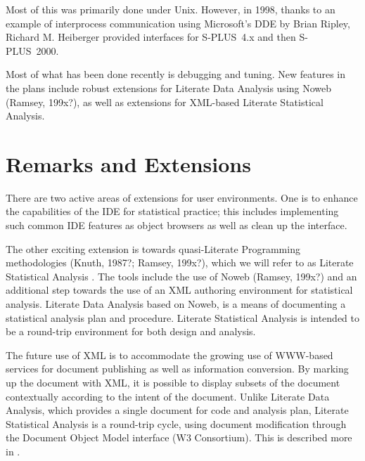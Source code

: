 \documentclass{article}
\newcommand*{\Splus}{\textsc{S-PLUS}}
\begin{document}
Most of this was primarily done under Unix.  However, in 1998, thanks
to an example of interprocess communication using Microsoft's DDE by
Brian Ripley, Richard M. Heiberger provided interfaces for \Splus~4.x
and then \Splus~2000.

Most of what has been done recently is debugging and tuning.  New
features in the plans include robust extensions for Literate Data
Analysis using Noweb (Ramsey, 199x?), as well as extensions for
XML-based Literate Statistical Analysis.

\section{Remarks and Extensions}
\label{sec:remarks}

There are two active areas of extensions for user environments.  One
is to enhance the capabilities of the IDE for statistical practice;
this includes implementing such common IDE features as object browsers
as well as clean up the interface.

The other exciting extension is towards quasi-Literate Programming
methodologies (Knuth, 1987?; Ramsey, 199x?), which we will refer to as
Literate Statistical Analysis \citep{ross:lunt:2001}. The tools include
the use of Noweb (Ramsey, 199x?) and an additional step towards the
use of an XML authoring environment for statistical analysis.
Literate Data Analysis based on Noweb, is a means of documenting a
statistical analysis plan and procedure.  Literate Statistical
Analysis is intended to be a round-trip environment for both design
and analysis.

The future use of XML is to accommodate the growing use of WWW-based
services for document publishing as well as information conversion.
By marking up the document with XML, it is possible to display subsets
of the document contextually according to the intent of the document.
Unlike Literate Data Analysis, which provides a single document for
code and analysis plan, Literate Statistical Analysis is a round-trip
cycle, using document modification through the Document Object Model
interface (W3 Consortium).  This is described more in
\citep{ross:lunt:2001}. 



\end{document}
